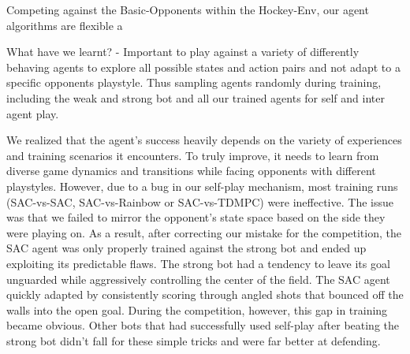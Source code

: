 Competing against the Basic-Opponents within the Hockey-Env, our agent algorithms are flexible a

What have we learnt?
- Important to play against a variety of differently behaving agents to explore all possible states and action pairs and not adapt to a specific opponents playstyle. Thus sampling agents randomly during training, including the weak and strong bot and all our trained agents for self and inter agent play.


We realized that the agent's success heavily depends on the variety of experiences and training scenarios it encounters. To truly improve, it needs to learn from diverse game dynamics and transitions while facing opponents with different playstyles. However, due to a bug in our self-play mechanism, most training runs (SAC-vs-SAC, SAC-vs-Rainbow or SAC-vs-TDMPC) were ineffective. The issue was that we failed to mirror the opponent’s state space based on the side they were playing on. As a result, after correcting our mistake for the competition, the SAC agent was only properly trained against the strong bot and ended up exploiting its predictable flaws. The strong bot had a tendency to leave its goal unguarded while aggressively controlling the center of the field. The SAC agent quickly adapted by consistently scoring through angled shots that bounced off the walls into the open goal. During the competition, however, this gap in training became obvious. Other bots that had successfully used self-play after beating the strong bot didn’t fall for these simple tricks and were far better at defending.

